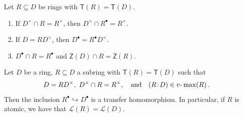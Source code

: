 \documentclass[10pt,a4paper]{amsart}
\newcommand{\DP}{\negthinspace : \negthinspace}
\begin{document}
	\begin{lemma}\label{lemma}
		Let $R \subseteq D$ be rings with $\mathsf T(R) =\mathsf T(D)$. 
		\begin{enumerate}[label=\normalfont(\arabic*)]	
			\item If $D^{\times} \cap R= R^{\times}$, then $D^\times \cap R^{\bullet}= R^\times$.
			\item If $D=RD^{\times}$, then $D^{\bullet}=R^{\bullet}D^\times$. 
			\item $D^{\bullet} \cap R = R^{\bullet}$ and $\mathsf Z(D) \cap R =\mathsf Z(R)$.
		\end{enumerate}
	\end{lemma}

 \begin{theorem}\label{prop2}
		Let $D$ be a ring, $R \subseteq D$ a subring with $\mathsf T (R)=\mathsf T (D)$ such that
\[
D = RD^{\times}, \  D^{\times} \cap R = R^{\times}, \quad \text{and} \quad { (R \DP D) \in v\text{-}\max (R)}  \,.
\]
Then the inclusion $R^{\bullet} \hookrightarrow D^{\bullet}$ is a transfer homomorphism.  In particular, if $R$ is atomic, we have that $\mathcal{L}(R)=\mathcal{L}(D).$
	\end{theorem}
\end{document}
